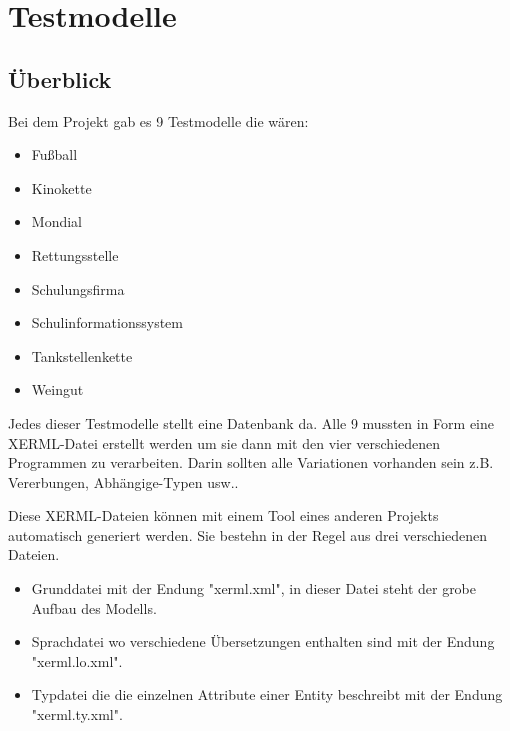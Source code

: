 \chapter{Testmodelle}
\label{cha:Testmodelle}
\fib{}
\section{Überblick}

\noindent
Bei dem Projekt gab es 9 Testmodelle die wären:
\begin{itemize}
    \item Fußball
    \item Kinokette
    \item Mondial
    \item Rettungsstelle
    \item Schulungsfirma
    \item Schulinformationssystem
    \item Tankstellenkette
    \item Weingut
\end{itemize}
\noindent

\noindent
Jedes dieser Testmodelle stellt eine Datenbank da. Alle 9 mussten in Form eine XERML-Datei erstellt werden um sie dann mit den vier verschiedenen Programmen zu verarbeiten. Darin sollten alle Variationen vorhanden sein z.B. Vererbungen, Abhängige-Typen usw..

\noindent
Diese XERML-Dateien können mit einem Tool eines anderen Projekts automatisch generiert werden.
Sie bestehn in der Regel aus drei verschiedenen Dateien.
\begin{itemize}
    \item Grunddatei mit der Endung "xerml.xml", in dieser Datei steht der grobe Aufbau des Modells.
    \item Sprachdatei wo verschiedene Übersetzungen enthalten sind mit der Endung "xerml.lo.xml".
    \item Typdatei die die einzelnen Attribute einer Entity beschreibt mit der Endung "xerml.ty.xml".
\end{itemize}